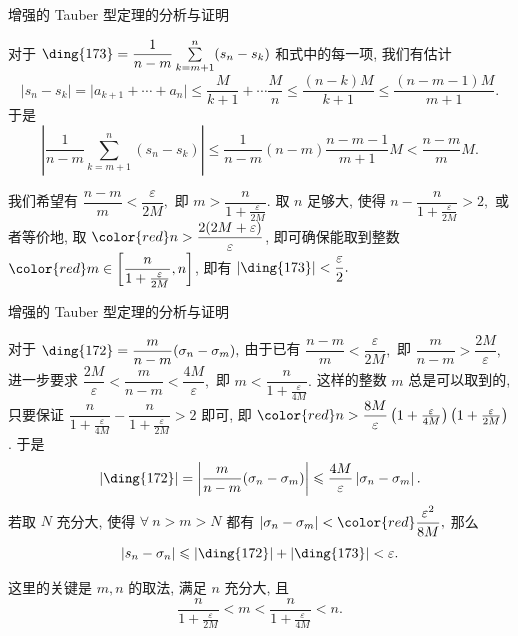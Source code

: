 
\begin{frame}{增强的 Tauber 型定理的分析与证明}

对于 $\text{\ding{173}} = \dfrac{1}{n-m} \sum\limits_{k=m+1}^{n} (s_n - s_k)$ 和式中的每一项, 我们有估计
\[
\lvert s_n - s_k \rvert = \lvert a_{k+1} + \cdots + a_n \rvert
\leqslant \dfrac{M}{k+1} + \cdots \dfrac{M}{n} \leqslant \dfrac{(n-k)M}{k+1} \leqslant \dfrac{(n-m-1)M}{m+1}.
\]
于是
{\smaller
\[
\left\lvert \dfrac{1}{n-m} \sum\limits_{k=m+1}^{n} (s_n - s_k) \right\rvert \leqslant \dfrac{1}{n-m} (n-m) \dfrac{n-m-1}{m+1} M < \dfrac{n-m}{m} M.
\]
}

\pause

我们希望有 $\dfrac{n-m}{m} < \dfrac{\varepsilon}{2M},$ 即 $m > \dfrac{n}{1 + \frac{\varepsilon}{2M}}.$ 取 $n$ 足够大, 使得 $n - \dfrac{n}{1 + \frac{\varepsilon}{2M}} > 2,$ 或者等价地, 取 $\color{red} n > \dfrac{2(2M + \varepsilon)}{\varepsilon}$, 即可确保能取到整数 $\color{red} m \in \left[ \dfrac{n}{1 + \frac{\varepsilon}{2M}}, n \right]$,
即有 $\lvert \text{\ding{173}} \rvert < \dfrac{\varepsilon}{2}.$

\end{frame}


\begin{frame}{增强的 Tauber 型定理的分析与证明}

对于 $\text{\ding{172}} = \dfrac{m}{n - m}(\sigma_n - \sigma_m),$ 由于已有 $\dfrac{n-m}{m} < \dfrac{\varepsilon}{2M},$ 即 $\dfrac{m}{n-m} > \dfrac{2M}{\varepsilon},$ 进一步要求 $\dfrac{2M}{\varepsilon} < \dfrac{m}{n-m} < \dfrac{4M}{\varepsilon},$ 即 $m < \dfrac{n}{1 + \frac{\varepsilon}{4M}}.$
\pause
这样的整数 $m$ 总是可以取到的, 只要保证 $\dfrac{n}{1 + \frac{\varepsilon}{4M}} - \dfrac{n}{1 + \frac{\varepsilon}{2M}} > 2$ 即可, 即 $\color{red} n > \dfrac{8M}{\varepsilon}\left(1 + \frac{\varepsilon}{4M}\right)\left(1 + \frac{\varepsilon}{2M}\right)$.
\pause
于是
\[\lvert \text{\ding{172}} \rvert = \left\lvert \dfrac{m}{n - m}(\sigma_n - \sigma_m) \right\rvert \leqslant \dfrac{4M}{\varepsilon} \left\lvert \sigma_n - \sigma_m \right\rvert.\]
若取 $N$ 充分大, 使得 $\forall~n > m > N$ 都有 $\left\lvert \sigma_n - \sigma_m \right\rvert < {\color{red} \dfrac{\varepsilon^2}{8M}},$ 那么
\[\left\lvert s_n - \sigma_n \right\rvert \leqslant \lvert \text{\ding{172}} \rvert + \lvert \text{\ding{173}} \rvert < \varepsilon.\]

\pause

\begin{attnblock}
这里的关键是 $m, n$ 的取法, 满足 $n$ 充分大, 且
\[
\dfrac{n}{1 + \frac{\varepsilon}{2M}} < m < \dfrac{n}{1 + \frac{\varepsilon}{4M}} < n.
\]
\end{attnblock}


\end{frame}

